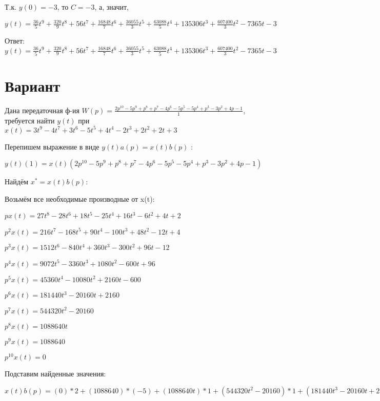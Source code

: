 \documentclass{article}
\begin{document}
{{{{{Т.к. $y(0)=-3$, то $C=-3$, а, значит, 

$y(t)=\frac{36}{5}t^{9}+\frac{320}{9}t^{8}+56t^{7}+\frac{16848}{7}t^{6}+\frac{36055}{3}t^{5}+\frac{63088}{5}t^{4}+135306t^{3}+\frac{607400}{3}t^{2}-7365t-3$

Ответ: $y(t) = \frac{36}{5}t^{9}+\frac{320}{9}t^{8}+56t^{7}+\frac{16848}{7}t^{6}+\frac{36055}{3}t^{5}+\frac{63088}{5}t^{4}+135306t^{3}+\frac{607400}{3}t^{2}-7365t-3$

\section{Вариант}

Дана передаточная ф-ия $W(p)=\frac{2p^{10}-5p^{9}+p^{8}+p^{7}-4p^{6}-5p^{5}-5p^{4}+p^{3}-3p^{2}+4p-1}{1}$, требуется найти $y(t)$ при $x(t)=3t^{9}-4t^{7}+3t^{6}-5t^{5}+4t^{4}-2t^{3}+2t^{2}+2t+3$

Перепишем выражение в виде $y(t)a(p)=x(t)b(p)$ :

$y(t)(1)=x(t)(2p^{10}-5p^{9}+p^{8}+p^{7}-4p^{6}-5p^{5}-5p^{4}+p^{3}-3p^{2}+4p-1)$

Найдём $x^*=x(t)b(p)$:

Возьмём все необходимые производные от x(t):

$px(t)=27t^{8}-28t^{6}+18t^{5}-25t^{4}+16t^{3}-6t^{2}+4t+2$

$p^2x(t)=216t^{7}-168t^{5}+90t^{4}-100t^{3}+48t^{2}-12t+4$

$p^3x(t)=1512t^{6}-840t^{4}+360t^{3}-300t^{2}+96t-12$

$p^4x(t)=9072t^{5}-3360t^{3}+1080t^{2}-600t+96$

$p^5x(t)=45360t^{4}-10080t^{2}+2160t-600$

$p^6x(t)=181440t^{3}-20160t+2160$

$p^7x(t)=544320t^{2}-20160$

$p^8x(t)=1088640t$

$p^9x(t)=1088640$

$p^10x(t)=0$

Подставим найденные значения:

$x(t)b(p) = (0)*2+(1088640)*(-5)+(1088640t)*1+(544320t^{2}-20160)*1+(181440t^{3}-20160t+2160)*(-4)+(45360t^{4}-10080t^{2}+2160t-600)*(-5)+(9072t^{5}-3360t^{3}+1080t^{2}-600t+96)*(-5)+(1512t^{6}-840t^{4}+360t^{3}-300t^{2}+96t-12)*1+(216t^{7}-168t^{5}+90t^{4}-100t^{3}+48t^{2}-12t+4)*(-3)+(27t^{8}-28t^{6}+18t^{5}-25t^{4}+16t^{3}-6t^{2}+4t+2)*4+(27t^{8}-28t^{6}+18t^{5}-25t^{4}+16t^{3}-6t^{2}+4t+2)*(-1)=81t^{8}-648t^{7}+1428t^{6}-44802t^{5}-227985t^{4}-708252t^{3}+588858t^{2}+1161624t$





}}}}}
\end{document}

